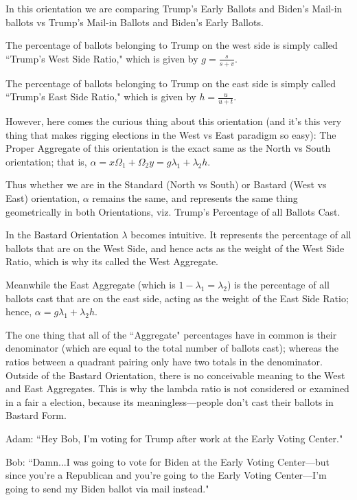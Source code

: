 In this orientation we are comparing Trump's Early Ballots and Biden's Mail-in ballots vs Trump's Mail-in Ballots and Biden's Early Ballots.

The percentage of ballots belonging to Trump on the west side is simply called ``Trump's West Side Ratio," which is given by $g=\frac{s}{s+v}$.

The percentage of ballots belonging to Trump on the east side is simply called ``Trump's East Side Ratio," which is given by $h=\frac{u}{u+t}$.

However, here comes the curious thing about this orientation (and it's this very thing that makes rigging elections in the West vs East paradigm so easy): The Proper Aggregate of this orientation is the exact same as the North vs South orientation; that is, $\alpha=x\Omega_{1}+\Omega_{2}y=g\lambda_{1}+\lambda_{2}h$.

Thus whether we are in the Standard (North vs South) or Bastard (West vs East) orientation, $\alpha$ remains the same, and represents the same thing geometrically in both Orientations, viz. Trump's Percentage of all Ballots Cast.

In the Bastard Orientation $\lambda$ becomes intuitive. It represents the percentage of all ballots that are on the West Side, and hence acts as the weight of the West Side Ratio, which is why its called the West Aggregate. 

Meanwhile the East Aggregate (which is $1-\lambda_{1}=\lambda_{2}$) is the percentage of all ballots cast that are on the east side, acting as the weight of the East Side Ratio; hence, $\alpha=g\lambda_{1}+\lambda_{2}h$.

The one thing that all of the ``Aggregate" percentages have in common is their denominator (which are equal to the total number of ballots cast); whereas the ratios between a quadrant pairing only have two totals in the denominator.
\newpage
Outside of the Bastard Orientation, there is no conceivable meaning to the West and East Aggregates. This is why the lambda ratio is not considered or examined in a fair a election, because its meaningless---people don't cast their ballots in Bastard Form.

Adam: ``Hey Bob, I'm voting for Trump after work at the Early Voting Center."

Bob: ``Damn...I was going to vote for Biden at the Early Voting Center---but since you're a Republican and you're going to the Early Voting Center---I'm going to send my Biden ballot via mail instead."

